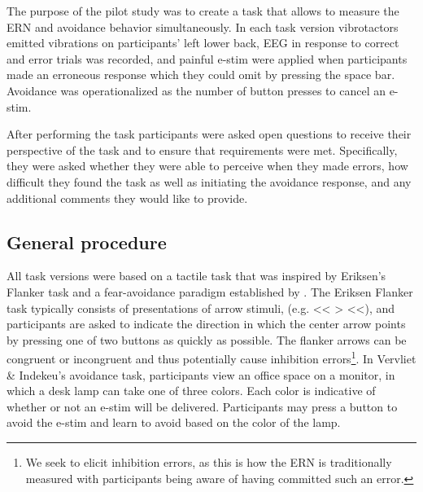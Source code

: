 \documentclass[twocolumn, serif, authordate, empirical]{jote-article}
\begin{document}
The purpose of the pilot study was to create a task that allows to measure the ERN and avoidance behavior simultaneously. In each task version vibrotactors emitted vibrations on participants' left lower back, EEG in response to correct and error trials was recorded, and painful e-stim were applied when participants made an erroneous response which they could omit by pressing the space bar. Avoidance was operationalized as the number of button presses to cancel an e-stim.

After performing the task participants were asked open questions to receive their perspective of the task and to ensure that requirements were met. Specifically, they were asked whether they were able to perceive when they made errors, how difficult they found the task as well as initiating the avoidance response, and any additional comments they would like to provide.

 {}\subsection*{General procedure} 

All task versions were based on a tactile task that was inspired by Eriksen's Flanker task \parencite{Eriksen1974} and a fear-avoidance paradigm established by \textcite{Vervliet2015}. The Eriksen Flanker task typically consists of presentations of arrow stimuli, (e.g. \textless\textless{} \textgreater{} \textless\textless), and participants are asked to indicate the direction in which the center arrow points by pressing one of two buttons as quickly as possible. The flanker arrows can be congruent or incongruent and thus potentially cause inhibition errors\footnote{  We seek to elicit inhibition errors, as this is how the ERN is traditionally measured \parencite{Ribes-Guardiola2020} with participants being aware of having committed such an error.
}. In Vervliet \& Indekeu's avoidance task, participants view an office space on a monitor, in which a desk lamp can take one of three colors. Each color is indicative of whether or not an e-stim will be delivered. Participants may press a button to avoid the e-stim and learn to avoid based on the color of the lamp.
\end{document}
